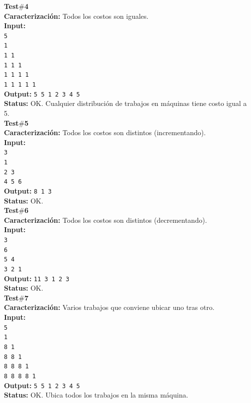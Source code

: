 \noindent\textbf{Test$\#$4}\\
\textbf{Caracterización:} Todos los costos son iguales.\\
\textbf{Input:}\\ \texttt{5\\1\\1 1\\1 1 1\\1 1 1 1\\1 1 1 1 1}\\
\textbf{Output:} \texttt{5 5 1 2 3 4 5}\\
\textbf{Status:} OK. Cualquier distribución de trabajos en máquinas tiene
costo igual a 5.\\

\noindent\textbf{Test$\#$5}\\
\textbf{Caracterización:} Todos los costos son distintos (incrementando).\\
\textbf{Input:}\\ \texttt{3\\1\\2 3\\4 5 6}\\
\textbf{Output:} \texttt{8 1 3}\\
\textbf{Status:} OK.\\

\noindent\textbf{Test$\#$6}\\
\textbf{Caracterización:} Todos los costos son distintos (decrementando).\\
\textbf{Input:}\\ \texttt{3\\6\\5 4\\3 2 1}\\
\textbf{Output:} \texttt{11 3 1 2 3}\\
\textbf{Status:} OK.\\

\noindent\textbf{Test$\#$7}\\
\textbf{Caracterización:} Varios trabajos que conviene ubicar uno tras otro.\\
\textbf{Input:}\\ \texttt{5\\1\\8 1\\8 8 1\\8 8 8 1\\8 8 8 8 1}\\
\textbf{Output:} \texttt{5 5 1 2 3 4 5}\\
\textbf{Status:} OK. Ubica todos los trabajos en la misma máquina.\\

